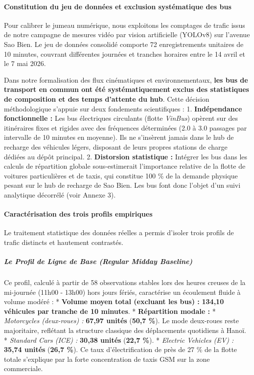\documentclass[10pt, a4paper]{article}
\begin{document}
\paragraph{Constitution du jeu de données et exclusion systématique des
bus}\label{constitution-du-jeu-de-donnuxe9es-et-exclusion-systuxe9matique-des-bus}

Pour calibrer le jumeau numérique, nous exploitons les comptages de
trafic issus de notre campagne de mesures vidéo par vision artificielle
(YOLOv8) sur l'avenue Sao Bien. Le jeu de données consolidé comporte 72
enregistrements unitaires de 10 minutes, couvrant différentes journées
et tranches horaires entre le 14 avril et le 7 mai 2026.

Dans notre formalisation des flux cinématiques et environnementaux,
\textbf{les bus de transport en commun ont été systématiquement exclus
des statistiques de composition et des temps d'attente du hub}. Cette
décision méthodologique s'appuie sur deux fondements scientifiques : 1.
\textbf{Indépendance fonctionnelle :} Les bus électriques circulants
(flotte \emph{VinBus}) opèrent sur des itinéraires fixes et rigides avec
des fréquences déterminées (2.0 à 3.0 passages par intervalle de 10
minutes en moyenne). Ils ne s'insèrent jamais dans le hub de recharge
des véhicules légers, disposant de leurs propres stations de charge
dédiées au dépôt principal. 2. \textbf{Distorsion statistique :}
Intégrer les bus dans les calculs de répartition globale sous-estimerait
l'importance relative de la flotte de voitures particulières et de
taxis, qui constitue 100 \% de la demande physique pesant sur le hub de
recharge de Sao Bien. Les bus font donc l'objet d'un suivi analytique
décorrélé (voir Annexe 3).

\paragraph{Caractérisation des trois profils
empiriques}\label{caractuxe9risation-des-trois-profils-empiriques}

Le traitement statistique des données réelles a permis d'isoler trois
profils de trafic distincts et hautement contrastés.

\subparagraph{Le Profil de Ligne de Base (Regular Midday
Baseline)}\label{le-profil-de-ligne-de-base-regular-midday-baseline}

Ce profil, calculé à partir de 58 observations stables lors des heures
creuses de la mi-journée (11h00 - 13h00) hors jours fériés, caractérise
un écoulement fluide à volume modéré : * \textbf{Volume moyen total
(excluant les bus) :} \textbf{134,10 véhicules par tranche de 10
minutes}. * \textbf{Répartition modale :} * \emph{Motorcycles
(deux-roues) :} \textbf{67,97 unités} (\textbf{50,7 \%}). Le mode
deux-roues reste majoritaire, reflétant la structure classique des
déplacements quotidiens à Hanoï. * \emph{Standard Cars (ICE) :}
\textbf{30,38 unités} (\textbf{22,7 \%}). * \emph{Electric Vehicles (EV)
:} \textbf{35,74 unités} (\textbf{26,7 \%}). Ce taux d'électrification
de près de 27 \% de la flotte totale s'explique par la forte
concentration de taxis GSM sur la zone commerciale.
\end{document}
